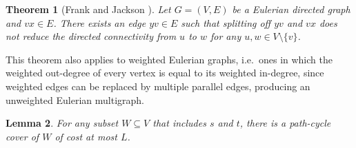 \documentclass[11pt]{article}
\newtheorem{theorem}{Theorem}[section]
\newtheorem{lemma}[theorem]{Lemma}
\begin{document}
\begin{theorem}[Frank \cite{frank} and Jackson \cite{jackson}] \label{thm:so}
Let $G=(V,E)$ be a Eulerian directed graph and $vx\in E$. There exists an edge $yv\in E$ such that splitting off $yv$ and $vx$ 
does not reduce the directed connectivity from $u$ to $w$ for any $u,w \in V\setminus \{v\}$.
\end{theorem}
This theorem also applies to weighted Eulerian graphs, i.e.\ ones in which the weighted out-degree of every vertex is equal to its weighted in-degree, since weighted edges can be replaced by multiple parallel edges, producing an unweighted Eulerian multigraph.

\begin{lemma} \label{lem:pathcyc}
For any subset $W\subseteq V$ that includes $s$ and $t$, there is 
a path-cycle cover of $W$ of cost at most $L$.
\end{lemma}
\end{document}
